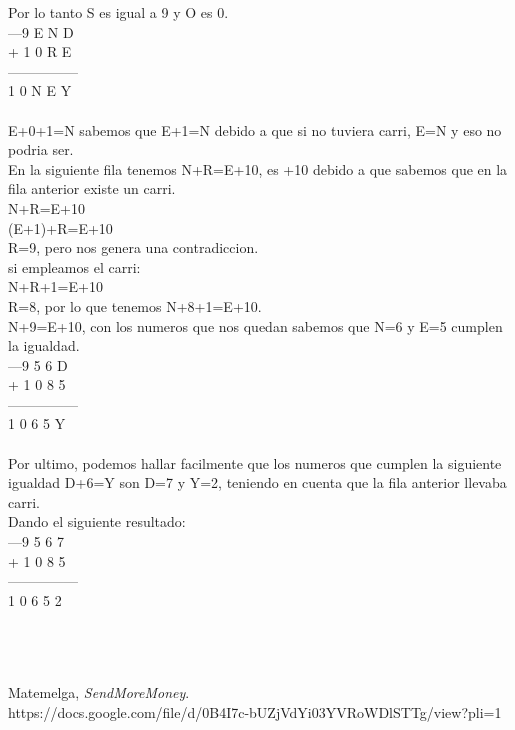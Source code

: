 \documentclass[a4paper,12pt]{article}
\begin{document}
Por lo tanto S es igual a 9 y O es 0.\\
---9 E N D\\
+ 1 0 R E\\
---------------\\
1 0 N E Y\\\\
E+0+1=N sabemos que E+1=N debido a que si no tuviera carri, E=N y eso no podria ser.\\
En la siguiente fila tenemos N+R=E+10, es +10 debido a que sabemos que en la fila anterior existe un carri.\\
N+R=E+10\\
(E+1)+R=E+10\\
R=9, pero nos genera una contradiccion.\\
si empleamos el carri:\\
N+R+1=E+10\\
R=8, por lo que tenemos N+8+1=E+10.\\
N+9=E+10, con los numeros que nos quedan sabemos que N=6 y E=5 cumplen la igualdad.\\
---9 5 6 D\\
+ 1 0 8 5\\
---------------\\
1 0 6 5 Y\\\\
Por ultimo, podemos hallar facilmente que los numeros que cumplen la siguiente igualdad D+6=Y son D=7 y Y=2, teniendo en cuenta que la fila anterior llevaba carri.\\
Dando el siguiente resultado:\\
---9 5 6 7\\
+ 1 0 8 5\\
---------------\\
1 0 6 5 2\\\\
\cite{R}\\\\
\clearpage
\begin{thebibliography}{15}

  Matemelga,
  \emph{SendMoreMoney}.\\
  https://docs.google.com/file/d/0B4I7c-bUZjVdYi03YVRoWDlSTTg/view?pli=1
  
\end{thebibliography}

\end{document}
